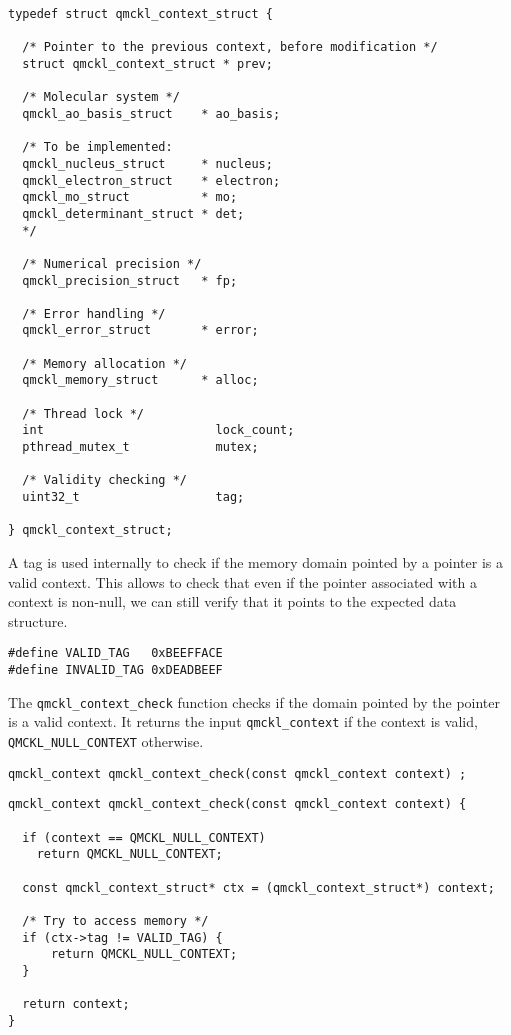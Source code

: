 \begin{verbatim}
typedef struct qmckl_context_struct {

  /* Pointer to the previous context, before modification */
  struct qmckl_context_struct * prev;

  /* Molecular system */
  qmckl_ao_basis_struct    * ao_basis;

  /* To be implemented:
  qmckl_nucleus_struct     * nucleus;
  qmckl_electron_struct    * electron;
  qmckl_mo_struct          * mo;
  qmckl_determinant_struct * det;
  */

  /* Numerical precision */
  qmckl_precision_struct   * fp;

  /* Error handling */
  qmckl_error_struct       * error;

  /* Memory allocation */
  qmckl_memory_struct      * alloc;

  /* Thread lock */
  int                        lock_count;
  pthread_mutex_t            mutex;

  /* Validity checking */
  uint32_t                   tag;

} qmckl_context_struct;
\end{verbatim}


A tag is used internally to check if the memory domain pointed
by a pointer is a valid context. This allows to check that even if
the pointer associated with a context is non-null, we can still
verify that it points to the expected data structure.

\begin{verbatim}
#define VALID_TAG   0xBEEFFACE
#define INVALID_TAG 0xDEADBEEF
\end{verbatim}

The \texttt{qmckl\_context\_check} function checks if the domain pointed by
the pointer is a valid context. It returns the input \texttt{qmckl\_context}
if the context is valid, \texttt{QMCKL\_NULL\_CONTEXT} otherwise.

\begin{verbatim}
qmckl_context qmckl_context_check(const qmckl_context context) ;
\end{verbatim}

\begin{verbatim}
qmckl_context qmckl_context_check(const qmckl_context context) {

  if (context == QMCKL_NULL_CONTEXT)
    return QMCKL_NULL_CONTEXT;

  const qmckl_context_struct* ctx = (qmckl_context_struct*) context;

  /* Try to access memory */
  if (ctx->tag != VALID_TAG) {
      return QMCKL_NULL_CONTEXT;
  }

  return context;
}
\end{verbatim}

